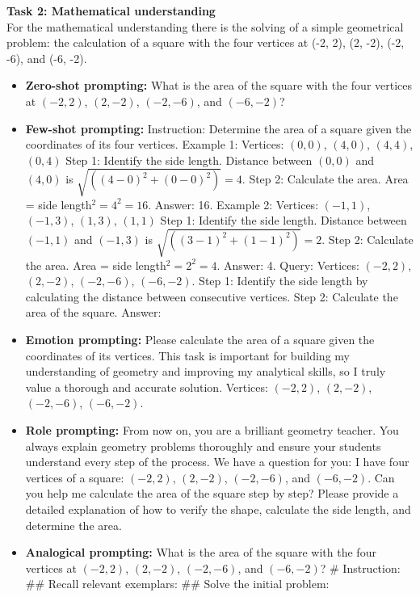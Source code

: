 \textbf{Task 2: Mathematical understanding}\\
For the mathematical understanding there is the solving of a simple geometrical problem: the calculation of a square with the four vertices at (-2, 2), (2, -2), (-2, -6), and (-6, -2). 
\begin{itemize}
    \item \textbf{Zero-shot prompting:} What is the area of the square with the four vertices at $(-2, 2)$, $(2, -2)$, $(-2, -6)$, and $(-6, -2)$?
    \item \textbf{Few-shot prompting:} Instruction: Determine the area of a square given the coordinates of its four vertices. 
    Example 1: Vertices: $(0, 0)$, $(4, 0)$, $(4, 4)$, $(0, 4)$ 
    Step 1: Identify the side length. Distance between $(0, 0)$ and $(4, 0)$ is $\sqrt{((4 - 0)^2 + (0 - 0)^2)} = 4$. 
    Step 2: Calculate the area. Area = side length$^2 = 4^2 = 16$. Answer: 16. 
    Example 2: Vertices: $(-1, 1)$, $(-1, 3)$, $(1, 3)$, $(1, 1)$ 
    Step 1: Identify the side length. Distance between $(-1, 1)$ and $(-1, 3)$ is $\sqrt{((3 - 1)^2 + (1 - 1)^2)} = 2$. 
    Step 2: Calculate the area. Area = side length$^2 = 2^2 = 4$. Answer: 4. 
    Query: Vertices: $(-2, 2)$, $(2, -2)$, $(-2, -6)$, $(-6, -2)$. 
    Step 1: Identify the side length by calculating the distance between consecutive vertices. 
    Step 2: Calculate the area of the square. Answer:
    \item \textbf{Emotion prompting:} Please calculate the area of a square given the coordinates of its vertices. This task is important for building my understanding of geometry and improving my analytical skills, so I truly value a thorough and accurate solution. Vertices: $(-2, 2)$, $(2, -2)$, $(-2, -6)$, $(-6, -2)$.
    \item \textbf{Role prompting:} From now on, you are a brilliant geometry teacher. You always explain geometry problems thoroughly and ensure your students understand every step of the process. We have a question for you: I have four vertices of a square: $(-2, 2)$, $(2, -2)$, $(-2, -6)$, and $(-6, -2)$. Can you help me calculate the area of the square step by step? Please provide a detailed explanation of how to verify the shape, calculate the side length, and determine the area.
    \item \textbf{Analogical prompting:} What is the area of the square with the four vertices at $(-2, 2)$, $(2, -2)$, $(-2, -6)$, and $(-6, -2)$? \# Instruction: \#\# Recall relevant exemplars: \#\# Solve the initial problem:
\end{itemize}
